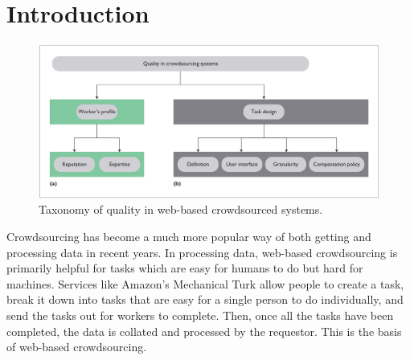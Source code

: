 \documentclass{sig-alternate-05-2015}
\begin{document}
	
	\section{Introduction}
	
	\begin{figure}
		\includegraphics[width=\textwidth]{taxonomy}
		\caption{Taxonomy of quality in web-based crowdsourced systems.}
		\label{fig-taxonomy}
	\end{figure}
	Crowdsourcing has become a much more popular way of both getting and processing data in recent years. In processing data, web-based crowdsourcing is primarily helpful for tasks which are easy for humans to do but hard for machines. \cite{burke2006participatory}
	Services like Amazon's Mechanical Turk allow people to create a task, break it down into tasks that are easy for a single person to do individually, and send the tasks out for workers to complete. Then, once all the tasks have been completed, the data is collated and processed by the requestor. This is the basis of web-based crowdsourcing. 
	
\end{document}
